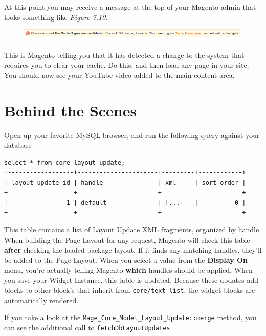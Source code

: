 \documentclass[oneside]{book}
\begin{document}
At this point you may receive a message at the top of your Magento admin that looks something like \emph{Figure 7.10}.

\begin{figure}[htb]
\begin{center}
\leavevmode
\includegraphics[width=1\textwidth]{images/chapter7/invalidated.png}
\end{center}
\caption{}
\end{figure}


This is Magento telling you that it has detected a change to the system that requires you to clear your cache.  Do this, and then load any page in your site.  You should now see your YouTube video added to the main content area.

\section{Behind the Scenes}

Open up your favorite MySQL browser, and run the following query against your database

\begin{lstlisting}
select * from core_layout_update;
+------------------+----------------------+---------+------------+
| layout_update_id | handle               | xml     | sort_order |
+------------------+----------------------+----------------------+
|                1 | default              | [...]   |          0 |
+------------------+----------------------+----------------------+

\end{lstlisting}


This table contains a list of Layout Update XML fragments, organized by handle.  When building the Page Layout for any request, Magento will check this table \textbf{after} checking the loaded package layout.  If it finds any matching handles, they'll be added to the Page Layout.  When you select a value from the \textbf{Display On} menu, you're actually telling Magento \textbf{which} handles should be applied.  When you save your Widget Instance, this table is updated.  Because these updates add blocks to other block's that inherit from \footnotesize\texttt{core/text\_list}\normalsize, the widget blocks are automatically rendered.

If you take a look at the \footnotesize\texttt{Mage\_Core\_Model\_Layout\_Update::merge} \normalsize  method, you can see the additional call to \footnotesize\texttt{fetchDbLayoutUpdates} \normalsize
\end{document}
